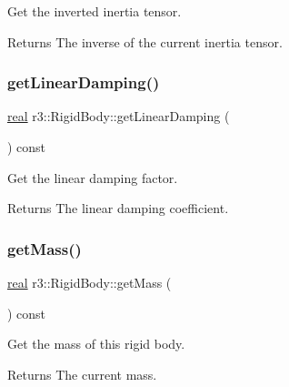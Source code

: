 Get the inverted inertia tensor. 

\begin{DoxyReturn}{Returns}
The inverse of the current inertia tensor. 
\end{DoxyReturn}
\mbox{\label{classr3_1_1_rigid_body_ab48c055a703f1d3d84b9f1977ef504e6}} 
\subsubsection{\texorpdfstring{get\+Linear\+Damping()}{getLinearDamping()}}
{\footnotesize\ttfamily \mbox{\hyperlink{namespacer3_ab2016b3e3f743fb735afce242f0dc1eb}{real}} r3\+::\+Rigid\+Body\+::get\+Linear\+Damping (\begin{DoxyParamCaption}{ }\end{DoxyParamCaption}) const}



Get the linear damping factor. 

\begin{DoxyReturn}{Returns}
The linear damping coefficient. 
\end{DoxyReturn}
\mbox{\label{classr3_1_1_rigid_body_a171ee8190ba1c7c2a40c5faf8d654170}} 
\subsubsection{\texorpdfstring{get\+Mass()}{getMass()}}
{\footnotesize\ttfamily \mbox{\hyperlink{namespacer3_ab2016b3e3f743fb735afce242f0dc1eb}{real}} r3\+::\+Rigid\+Body\+::get\+Mass (\begin{DoxyParamCaption}{ }\end{DoxyParamCaption}) const}



Get the mass of this rigid body. 

\begin{DoxyReturn}{Returns}
The current mass. 
\end{DoxyReturn}
\mbox{\label{classr3_1_1_rigid_body_ae12d1d4d9dbbb970ed83fa1eab2d928a}} 
